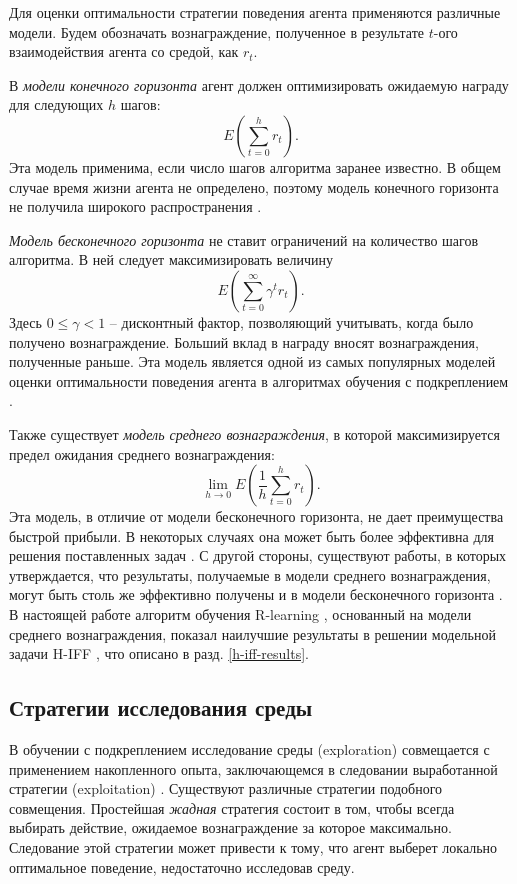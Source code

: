 		Для оценки оптимальности стратегии поведения агента применяются различные модели. Будем обозначать вознаграждение, полученное в результате $t$-ого взаимодействия агента со средой, как $r_t$. 
		
		В \emph{модели конечного горизонта} агент должен оптимизировать ожидаемую награду для следующих $h$ шагов:
		$$E(\sum_{t = 0} ^ {h} {r_t}).$$
		Эта модель применима, если число шагов алгоритма заранее известно. В общем случае время жизни агента не определено, поэтому модель конечного горизонта не получила широкого распространения \cite{survey}.
				
		\emph{Модель бесконечного горизонта} не ставит ограничений на количество шагов алгоритма. В ней следует максимизировать величину
		$$E(\sum_{t = 0}^{\infty}{\gamma^t r_t}).$$
		Здесь $0 \leq \gamma < 1$ -- дисконтный фактор, позволяющий учитывать, когда было получено вознаграждение. Больший вклад в награду вносят вознаграждения, полученные раньше. Эта модель является одной из самых популярных моделей оценки оптимальности поведения агента в алгоритмах обучения с подкреплением \cite{systems}.
		
		Также существует \emph{модель среднего вознаграждения}, в которой максимизируется предел ожидания среднего вознаграждения:
		$$\lim_{h \rightarrow 0} E(\frac{1}{h} \sum_{t=0}^{h}{r_t}).$$
		Эта модель, в отличие от модели бесконечного горизонта, не дает преимущества быстрой прибыли. В некоторых случаях она может быть более эффективна для решения поставленных задач \cite{average}. С другой стороны, существуют работы, в которых утверждается, что результаты, получаемые в модели среднего вознаграждения, могут быть столь же эффективно получены и в модели бесконечного горизонта \cite{average-discounted}. В настоящей работе алгоритм обучения R-learning \cite{r-learning}, основанный на модели среднего вознаграждения, показал наилучшие результаты в решении модельной задачи H-IFF \cite{mh-iff}, что описано в разд. \ref{h-iff-results}. 
		
		\subsection{Стратегии исследования среды}
		\label{strategy}
		
		 В обучении с подкреплением исследование среды (exploration) совмещается с применением накопленного опыта, заключающемся в следовании выработанной стратегии (exploitation) \cite{survey}. Существуют различные стратегии подобного совмещения. Простейшая \emph{жадная} стратегия состоит в том, чтобы всегда выбирать действие, ожидаемое вознаграждение за которое максимально. Следование этой стратегии может привести к тому, что агент выберет локально оптимальное поведение, недостаточно исследовав среду. 
		 

